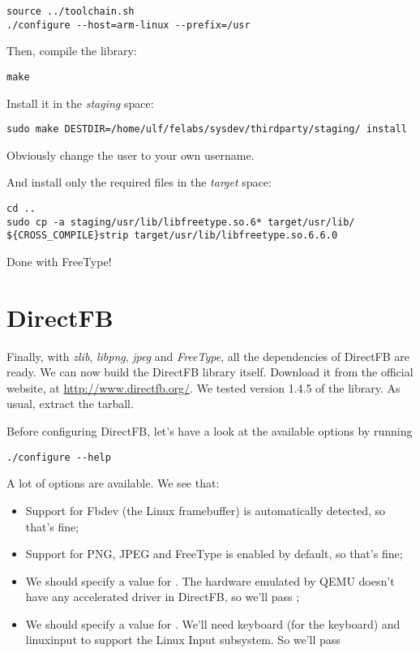 \begin{verbatim}
source ../toolchain.sh
./configure	--host=arm-linux --prefix=/usr
\end{verbatim}

Then, compile the library:

\begin{verbatim}
make
\end{verbatim}

Install it in the {\em staging} space:

\begin{verbatim}
sudo make DESTDIR=/home/ulf/felabs/sysdev/thirdparty/staging/ install
\end{verbatim}

Obviously change the user to your own username.

And install only the required files in the {\em target} space:

\begin{verbatim}
cd ..
sudo cp -a staging/usr/lib/libfreetype.so.6* target/usr/lib/
${CROSS_COMPILE}strip target/usr/lib/libfreetype.so.6.6.0
\end{verbatim}

Done with FreeType!

\clearpage

\section{DirectFB}

Finally, with {\em zlib}, {\em libpng}, {\em jpeg} and {\em FreeType},
all the dependencies of DirectFB are ready. We can now build the
DirectFB library itself. Download it from the official website, at
\url{http://www.directfb.org/}. We tested version 1.4.5 of the
library. As usual, extract the tarball.

Before configuring DirectFB, let's have a look at the available
options by running 

\begin{verbatim}
./configure --help
\end{verbatim}

A lot of options are available. We see that:

\begin{itemize}
\item Support for Fbdev (the Linux framebuffer) is automatically
  detected, so that's fine;
\item Support for PNG, JPEG and FreeType is enabled by default, so
  that's fine;
\item We should specify a value for . The
  hardware emulated by QEMU doesn't have any accelerated driver in
  DirectFB, so we'll pass ;
\item We should specify a value for . We'll
  need keyboard (for the keyboard) and linuxinput to support the Linux
  Input subsystem. So we'll pass
\end{itemize}

